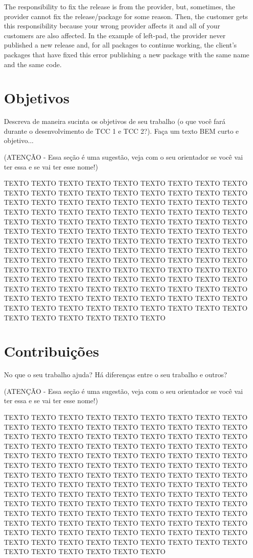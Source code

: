 The responsibility to fix the release is from the provider, but, sometimes, the provider cannot fix the release/package for some reason. Then, the customer gets this responsibility because your wrong provider affects it and all of your customers are also affected. In the example of left-pad, the provider never published a new release and, for all packages to continue working, the client's packages that have fixed this error publishing a new package with the same name and the same code.
\section{Objetivos}
\label{cap:introducao:sec:objetivos}

Descreva de maneira sucinta os objetivos de seu trabalho (o que você fará durante o desenvolvimento de TCC 1 e TCC 2?). Faça um texto BEM curto e objetivo...

(ATENÇÃO - Essa seção é uma sugestão, veja com o seu orientador se você vai ter essa e se vai ter esse nome!)

TEXTO TEXTO TEXTO TEXTO TEXTO TEXTO TEXTO TEXTO TEXTO TEXTO TEXTO TEXTO TEXTO TEXTO TEXTO TEXTO TEXTO TEXTO TEXTO TEXTO TEXTO TEXTO TEXTO TEXTO TEXTO TEXTO TEXTO TEXTO TEXTO TEXTO TEXTO TEXTO TEXTO TEXTO TEXTO TEXTO TEXTO TEXTO TEXTO TEXTO TEXTO TEXTO TEXTO TEXTO TEXTO TEXTO TEXTO TEXTO TEXTO TEXTO TEXTO TEXTO TEXTO TEXTO TEXTO TEXTO TEXTO TEXTO TEXTO TEXTO TEXTO TEXTO TEXTO TEXTO TEXTO TEXTO TEXTO TEXTO TEXTO TEXTO TEXTO TEXTO TEXTO TEXTO TEXTO TEXTO TEXTO TEXTO TEXTO TEXTO TEXTO TEXTO TEXTO TEXTO TEXTO TEXTO TEXTO TEXTO TEXTO TEXTO TEXTO TEXTO TEXTO TEXTO TEXTO TEXTO TEXTO TEXTO TEXTO TEXTO TEXTO TEXTO TEXTO TEXTO TEXTO TEXTO TEXTO TEXTO TEXTO TEXTO TEXTO TEXTO TEXTO TEXTO TEXTO TEXTO TEXTO TEXTO TEXTO TEXTO TEXTO TEXTO TEXTO TEXTO TEXTO TEXTO TEXTO TEXTO TEXTO TEXTO TEXTO TEXTO

\section{Contribuições}
\label{cap:introducao:sec:contribuicoes}

No que o seu trabalho ajuda? Há diferenças entre o seu trabalho e outros?

(ATENÇÃO - Essa seção é uma sugestão, veja com o seu orientador se você vai ter essa e se vai ter esse nome!)

TEXTO TEXTO TEXTO TEXTO TEXTO TEXTO TEXTO TEXTO TEXTO TEXTO TEXTO TEXTO TEXTO TEXTO TEXTO TEXTO TEXTO TEXTO TEXTO TEXTO TEXTO TEXTO TEXTO TEXTO TEXTO TEXTO TEXTO TEXTO TEXTO TEXTO TEXTO TEXTO TEXTO TEXTO TEXTO TEXTO TEXTO TEXTO TEXTO TEXTO TEXTO TEXTO TEXTO TEXTO TEXTO TEXTO TEXTO TEXTO TEXTO TEXTO TEXTO TEXTO TEXTO TEXTO TEXTO TEXTO TEXTO TEXTO TEXTO TEXTO TEXTO TEXTO TEXTO TEXTO TEXTO TEXTO TEXTO TEXTO TEXTO TEXTO TEXTO TEXTO TEXTO TEXTO TEXTO TEXTO TEXTO TEXTO TEXTO TEXTO TEXTO TEXTO TEXTO TEXTO TEXTO TEXTO TEXTO TEXTO TEXTO TEXTO TEXTO TEXTO TEXTO TEXTO TEXTO TEXTO TEXTO TEXTO TEXTO TEXTO TEXTO TEXTO TEXTO TEXTO TEXTO TEXTO TEXTO TEXTO TEXTO TEXTO TEXTO TEXTO TEXTO TEXTO TEXTO TEXTO TEXTO TEXTO TEXTO TEXTO TEXTO TEXTO TEXTO TEXTO TEXTO TEXTO TEXTO TEXTO TEXTO TEXTO TEXTO TEXTO

